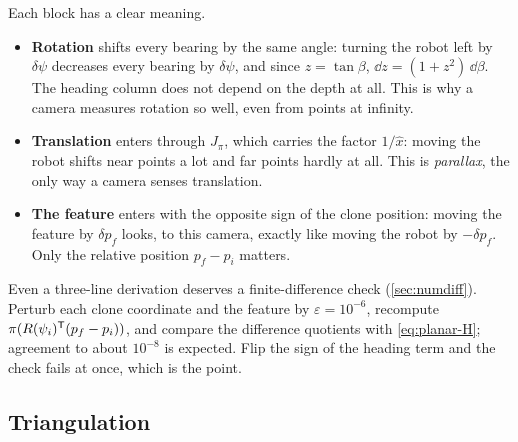 Each block has a clear meaning.
\begin{itemize}
  \item \textbf{Rotation} shifts every bearing by the same angle: turning the robot left by $\delta\psi$ decreases every bearing by $\delta\psi$, and since
        $z = \tan\beta$, $\dd z = (1 + z^2)\,\dd\beta$. The heading column does not depend on the depth at all. This is why a camera measures
        rotation so well, even from points at infinity.
  \item \textbf{Translation} enters through $J_\pi$, which carries the factor $1/\hat x$: moving the robot shifts near points a lot and far points
        hardly at all. This is \emph{parallax}, the only way a camera senses translation.
  \item \textbf{The feature} enters with the opposite sign of the clone position: moving the feature by $\delta p_f$ looks, to this camera, exactly like
        moving the robot by $-\delta p_f$. Only the relative position $p_f - p_i$ matters.
\end{itemize}

\begin{implnote}
Even a three-line derivation deserves a finite-difference check (\cref{sec:numdiff}). Perturb each clone coordinate and the feature by
$\varepsilon = 10^{-6}$, recompute $\pi(R(\psi_i)^{\mathsf{T}}(p_f - p_i))$, and compare the difference quotients with \eqref{eq:planar-H}; agreement to
about $10^{-8}$ is expected. Flip the sign of the heading term and the check fails at once, which is the point.
\end{implnote}

\subsection{Triangulation}

